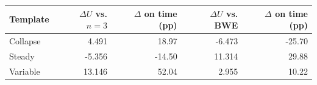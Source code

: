 \begin{tabular}{lrrrr}
\toprule
Template & $\Delta U$ vs. $n=3$ & $\Delta$ on time (pp) & $\Delta U$ vs. BWE & $\Delta$ on time (pp)\\
\midrule
Collapse & 4.491 & 18.97 & -6.473 & -25.70\\
Steady & -5.356 & -14.50 & 11.314 & 29.88\\
Variable & 13.146 & 52.04 & 2.955 & 10.22\\
\bottomrule
\end{tabular}
